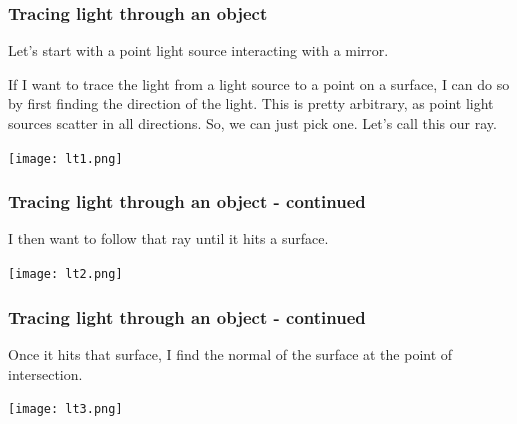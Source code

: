 \documentclass[12pt]{beamer}
\begin{document}
  \begin{frame}
    \frametitle{Tracing light through an object}
    Let's start with a point light source interacting with a mirror.

    If I want to trace the light from a light source to a point on a surface, I can do so by first finding the direction of the light.
    This is pretty arbitrary, as point light sources scatter in all directions.
    So, we can just pick one.
    Let's call this our ray.

    \texttt{[image: lt1.png]}

  \end{frame}

  \begin{frame}
    \frametitle{Tracing light through an object - continued}



    I then want to follow that ray until it hits a surface.

    \texttt{[image: lt2.png]}


  \end{frame}

  \begin{frame}
    \frametitle{Tracing light through an object - continued}
    Once it hits that surface, I find the normal of the surface at the point of intersection.


    \texttt{[image: lt3.png]}

  \end{frame}
\end{document}
